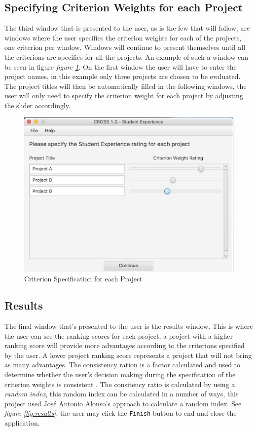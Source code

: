 \documentclass[11pt]{article}
\newcommand{\code}[1]{\texttt{#1}}
\begin{document}
		\subsection{Specifying Criterion Weights for each Project}
			The third window that is presented to the user, as is the few that will follow, are windows where the user specifies the criterion weights for each of the projects, one criterion per window. Windows will continue to present themselves until all the criterions are specifies for all the projects. An example of such a window can be seen in figure \textit{figure \ref{fig:criterion_iterator}}. On the first window the user will have to enter the project names, in this example only three projects are chosen to be evaluated. The project titles will then be automatically filled in the following windows, the user will only need to specify the criterion weight for each project by adjusting the slider accordingly.
			
			\begin{figure}[!htb]
				\centering
				\includegraphics[scale=0.55]{criterion_iterator}
				\caption{Criterion Specification for each Project} %
				\label{fig:criterion_iterator} %
			\end{figure}
			

		\subsection{Results}
			The final window that's presented to the user is the results window. This is where the user can see the ranking scores for each project, a project with a higher ranking score will provide more advantages according to the criterions specified by the user. A lower project ranking score represents a project that will not bring as many advantages. The consistency ration is a factor calculated and used to determine whether the user's decision making during the specification of the criterion weights is consistent \cite{taylor2004introduction}. The consitency ratio is calculated by using a \textit{random index}, this random index can be calculated in a number of ways, this project used Jos\'e Antonio Alonso's approach \cite{alonso2006consistency} to calculate a random index. See \textit{figure \ref{fig:results}}, the user may click the \code{Finish} button to end and close the application.
			
\end{document}
